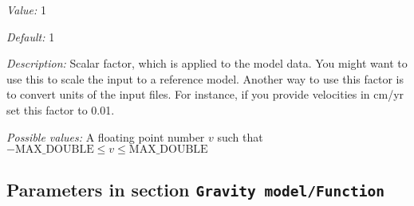 \begin{itemize}
{\it Value:} 1


{\it Default:} 1


{\it Description:} Scalar factor, which is applied to the model data. You might want to use this to scale the input to a reference model. Another way to use this factor is to convert units of the input files. For instance, if you provide velocities in cm/yr set this factor to 0.01.


{\it Possible values:} A floating point number $v$ such that $-\text{MAX\_DOUBLE} \leq v \leq \text{MAX\_DOUBLE}$
\end{itemize}

\subsection{Parameters in section \tt Gravity model/Function}
\label{parameters:Gravity_20model/Function}


